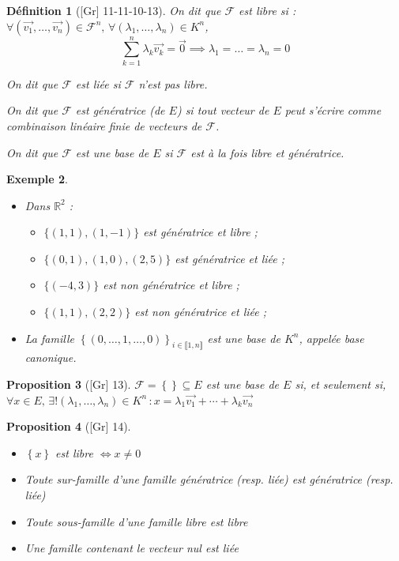 \documentclass[10pt, a4paper, parskip=full, twoside, twocolumn]{report}
\newtheorem{definition}{Définition}
\newtheorem{proposition}[definition]{Proposition}
\newtheorem{example}[definition]{Exemple}
\newcommand{\IR}{\mathbb{R}}
\begin{document}
\begin{definition}[\textnormal{[Gr] 11-11-10-13}]
	On dit que $\mathcal{F}$ est \emph{libre} si :
	$\forall (\overrightarrow{v_1}, \dots, \overrightarrow{v_n})\in\mathcal{F}^n,\, \forall (\lambda_1, \dots, \lambda_n) \in K^n$,
	$$\sum_{k=1}^{n}\lambda_k \overrightarrow{v_k} = \overrightarrow{0}\implies \lambda_1 = \dots = \lambda_n = 0$$

	On dit que $\mathcal{F}$ est \emph{liée} si $\mathcal{F}$ n'est pas libre.

	On dit que $\mathcal{F}$ est \emph{génératrice} (de $E$) si tout vecteur de $E$ peut s'écrire 
	comme combinaison linéaire finie de vecteurs de $\mathcal{F}$.

	On dit que $\mathcal{F}$ est une base de $E$ si $\mathcal{F}$ est à la fois libre et génératrice.
\end{definition}

\begin{example}
	\begin{itemize}
		\item Dans $\IR^2$ : \begin{itemize}
			\item $\{(1,1), (1,-1)\}$ est génératrice et libre ;
			\item $\{(0,1), (1,0), (2,5)\}$ est génératrice et liée ;
			\item $\{(-4, 3)\}$ est non génératrice et libre ;
			\item $\{(1,1), (2,2)\}$ est non génératrice et liée ;
		\end{itemize}
		\item [\textnormal{[Gr] 14}] La famille $\left\{(0,\dots, 1, \dots, 0)\right\}_{i\in \llbracket 1,n\rrbracket}$ est une base de $K^n$, appelée \emph{base canonique}.
	\end{itemize}
\end{example}

\begin{proposition}[\textnormal{[Gr] 13}]
	$\mathcal{F} = \left\{\right\}\subseteq E$ est une base de $E$ si, et seulement si,
	$\forall x\in E,\, \exists ! (\lambda_1,\dots,\lambda_n)\in K^n\,\colon x = \lambda_1\overrightarrow{v_1} + \cdots + \lambda_k\overrightarrow{v_n}$
\end{proposition}

\begin{proposition}[\textnormal{[Gr] 14}]
	\begin{itemize}
		\item $\left\{x\right\}$ est libre $\iff x\neq 0$
		\item Toute sur-famille d'une famille génératrice (resp. liée) est génératrice (resp. liée)
		\item Toute sous-famille d'une famille libre est libre 
		\item Une famille contenant le vecteur nul est liée
	\end{itemize}
\end{proposition}
\end{document}
